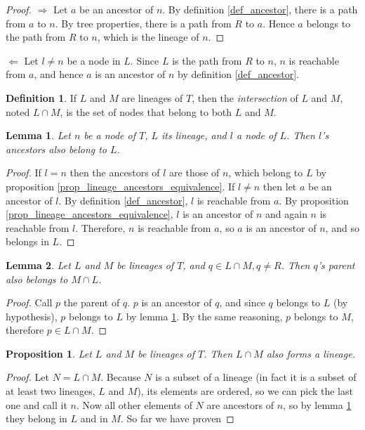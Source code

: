 \documentclass[a4paper,10pt]{report}
\newtheorem{prop}{Proposition}
\newtheorem{lemma}{Lemma}
\theoremstyle{definition}
\newtheorem{dfn}{Definition}
\begin{document}
\begin{proof}

$\Rightarrow$ Let $a$ be an ancestor of $n$. By definition \ref{def_ancestor}, there is a path from $a$ to $n$. By tree properties, there is a path from $R$ to $a$. Hence $a$ belongs to the path from $R$ to $n$, which is the lineage of $n$.
\end{proof}

\noindent{}$\Leftarrow$ Let $l \neq n$ be a node in $L$. Since $L$ is the path from $R$ to $n$, $n$ is reachable from $a$, and hence $a$ is an ancestor of $n$ by definition \ref{def_ancestor}.

\begin{dfn}
If $L$ and $M$ are lineages of $T$, then the \textit{intersection}
of $L$ and $M$, noted $L \cap M$, is the set of nodes that belong to both $L$ and $M$.
\end{dfn} 

\begin{lemma}
\label{lem_ancestors_in_lineage}
Let $n$ be a node of $T$, $L$ its lineage, and $l$ a node of $L$. Then $l$'s ancestors also belong to $L$.
\end{lemma}
\begin{proof}
If $l = n$ then the ancestors of $l$ are those of $n$, which belong to $L$ by proposition \ref{prop_lineage_ancestors_equivalence}. If $l \neq n$ then let $a$ be an ancestor of $l$. By definition \ref{def_ancestor}, $l$ is reachable from $a$. By proposition \ref{prop_lineage_ancestors_equivalence}, $l$ is an ancestor of $n$ and again $n$ is reachable from $l$. Therefore, $n$ is reachable from $a$, so $a$ is an ancestor of $n$, and so belongs in $L$.
\end{proof}

\begin{lemma}
Let $L$ and $M$ be lineages of $T$, and $q \in L \cap M, q \neq R$. Then $q$'s parent also belongs to $M \cap L$.
\end{lemma}
\begin{proof}
Call $p$ the parent of $q$. $p$ is an ancestor of $q$, and since $q$ belongs to $L$ (by hypothesis), $p$ belongs to $L$ by lemma \ref{lem_ancestors_in_lineage}. By the same reasoning, $p$ belongs to $M$, therefore $p \in L \cap M$.

\end{proof}


\begin{prop}
\label{prop_lineage_intersection}
Let $L$ and $M$ be lineages of $T$. Then $L \cap M$ also forms a lineage.
\end{prop}
\begin{proof}
Let $N = L \cap M$. Because $N$ is a subset of a lineage (in fact it is a subset of at least two lineages, $L$ and $M$), its elements are ordered, so we can pick the last one and call it $n$. Now all other elements of $N$ are ancestors of $n$, so by lemma \ref{lem_ancestors_in_lineage} they belong in $L$ and in $M$. So far we have proven 
\end{proof}
\end{document}
